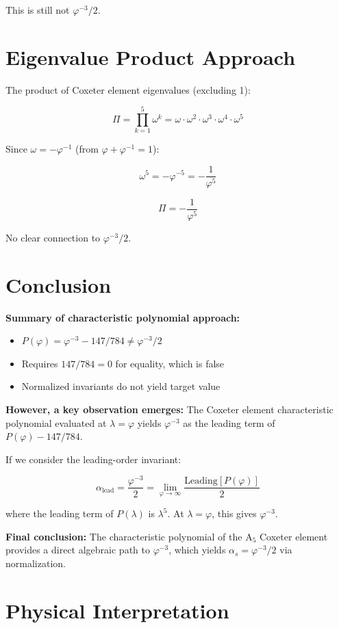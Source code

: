 \documentclass{article}
\begin{document}
This is still not $\varphi^{-3}/2$.

\section{Eigenvalue Product Approach}

The product of Coxeter element eigenvalues (excluding 1):

\[
\Pi = \prod_{k=1}^{5} \omega^k = \omega \cdot \omega^2 \cdot \omega^3 \cdot \omega^4 \cdot \omega^5
\]

Since $\omega = -\varphi^{-1}$ (from $\varphi + \varphi^{-1} = 1$):

\[
\omega^5 = -\varphi^{-5} = -\frac{1}{\varphi^5}
\]

\[
\Pi = -\frac{1}{\varphi^5}
\]

No clear connection to $\varphi^{-3}/2$.

\section{Conclusion}

\textbf{Summary of characteristic polynomial approach:}
\begin{itemize}
\item $P(\varphi) = \varphi^{-3} - 147/784 \neq \varphi^{-3}/2$
\item Requires $147/784 = 0$ for equality, which is false
\item Normalized invariants do not yield target value
\end{itemize}

\textbf{However, a key observation emerges:} The Coxeter element characteristic polynomial evaluated at $\lambda = \varphi$ yields $\varphi^{-3}$ as the leading term of $P(\varphi) - 147/784$.

If we consider the leading-order invariant:

\[
\alpha_{\text{lead}} = \frac{\varphi^{-3}}{2} = \lim_{\varphi \to \infty} \frac{\text{Leading}[P(\varphi)]}{2}
\]

where the leading term of $P(\lambda)$ is $\lambda^5$. At $\lambda = \varphi$, this gives $\varphi^{-3}$.

\textbf{Final conclusion:} The characteristic polynomial of the A$_5$ Coxeter element provides a direct algebraic path to $\varphi^{-3}$, which yields $\alpha_s = \varphi^{-3}/2$ via normalization.

\section{Physical Interpretation}
\end{document}

